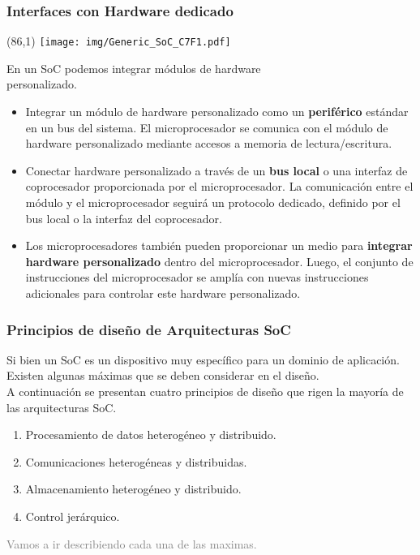 \documentclass[aspectratio=169]{beamer}
\begin{document}
\begin{frame}[t,fragile]
    \frametitle{Interfaces con Hardware dedicado}
    \begin{textblock}{10}(86,1) \texttt{[image: img/Generic\_SoC\_C7F1.pdf]} \end{textblock}
    \small
    En un SoC podemos integrar módulos de hardware\\
    personalizado.
    \bigskip
    \begin{itemize}
    \item<3-> Integrar un módulo de hardware personalizado como un \textbf{periférico} estándar en un bus del sistema.
    \textcolor{verdeuca}{El microprocesador se comunica con el módulo de hardware personalizado mediante accesos a memoria de lectura/escritura.}
    \item<4-> Conectar hardware personalizado a través de un \textbf{bus local} o una interfaz de coprocesador proporcionada por el microprocesador.
    \textcolor{verdeuca}{La comunicación entre el módulo y el microprocesador seguirá un protocolo dedicado, definido por el bus local o la interfaz del coprocesador.}
    \item<5-> Los microprocesadores también pueden proporcionar un medio para \textbf{integrar hardware personalizado} dentro del microprocesador.
    \textcolor{verdeuca}{Luego, el conjunto de instrucciones del microprocesador se amplía con nuevas instrucciones adicionales para controlar este hardware personalizado.}
    \end{itemize}
\end{frame}

\begin{frame}[t,fragile]
    \frametitle{Principios de diseño de Arquitecturas SoC}
    Si bien un SoC es un dispositivo muy específico para un dominio de aplicación.\\
    \textcolor{verdeuca}{Existen algunas máximas que se deben considerar en el diseño.}\\
    \bigskip
    A continuación se presentan cuatro principios de diseño que rigen la mayoría de las arquitecturas SoC.
    \bigskip
    \begin{enumerate}
    \setlength\itemsep{0.3cm}
    \item Procesamiento de datos heterogéneo y distribuido. %
    \item Comunicaciones heterogéneas y distribuidas. %
    \item Almacenamiento heterogéneo y distribuido. %
    \item Control jerárquico. %
    \end{enumerate}
    \bigskip
    \textcolor{gray}{Vamos a ir describiendo cada una de las maximas.}
\end{frame}
\end{document}
